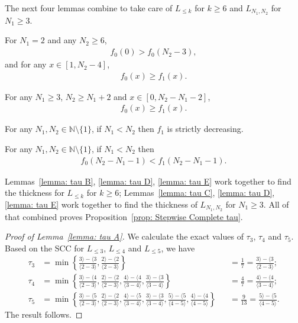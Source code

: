 \documentclass{ws-ijnt}
\begin{document}
	The next four lemmas combine to take care of $L_{\leq k}$ for $k\geq 6$ and $L_{N_1,N_2}$ for $N_1\geq 3$.
	\begin{lemma}\label{lemma: tau B}
		For $N_1=2$ and any $N_2\geq 6$, 
		\begin{align*}
			f_0(0)>f_0(N_2-3),
		\end{align*}
		and for any $x\in[1,N_2-4]$,
		\begin{align*}
			f_0(x)\geq f_1(x).
		\end{align*}
	\end{lemma}
	\begin{lemma}\label{lemma: tau C}
		For any $N_1\geq3$, $N_2\geq N_1+2$ and $x\in[0,N_2-N_1-2]$,
		\begin{align*}
			f_0(x)\geq f_1(x).
		\end{align*}
	\end{lemma}
	\begin{lemma}\label{lemma: tau D}
		For any $N_1,N_2\in\mathbb{N}\setminus\{1\}$, if $N_1<N_2$ then $f_1$ is strictly decreasing.
	\end{lemma}
	\begin{lemma}\label{lemma: tau E}
		For any $N_1,N_2\in\mathbb{N}\setminus\{1\}$, if $N_1<N_2$ then
		\begin{align*}
			f_0(N_2-N_1-1)<f_1(N_2-N_1-1).
		\end{align*}
	\end{lemma}
	Lemmas~\ref{lemma: tau B}, \ref{lemma: tau D}, \ref{lemma: tau E} work together to find the thickness for $L_{\leq k}$ for $k\geq 6$; Lemmas~\ref{lemma: tau C}, \ref{lemma: tau D}, \ref{lemma: tau E} work together to find the thickness of $L_{N_1,N_2}$ for $N_1\geq 3$. All of that combined proves Proposition~\ref{prop: Stepwise Complete tau}.
	
	\begin{proof}[Proof of Lemma~\ref{lemma: tau A}]
		We calculate the exact values of $\tau_3$, $\tau_4$ and $\tau_5$. Based on the SCC for $L_{\leq 3}$, $L_{\leq 4}$ and $L_{\leq 5}$, we have
		\begin{align*}
			\tau_3
			&= \min\left\{ \frac{3\rangle-\langle3}{\langle2 -3\rangle},\frac{2\rangle-\langle 2}{\langle2-3\rangle}\right\}
			&&=\frac{1}{7}=\frac{3\rangle-\langle 3}{\langle 2-3\rangle}; \\
			\tau_4
			&= \min\left\{\frac{3\rangle-\langle4}{\langle 2-3\rangle}, \frac{2\rangle-\langle2}{\langle 2-3\rangle},\frac{4\rangle-\langle 4}{\langle 3-4\rangle},\frac{3\rangle-\langle 3}{\langle3-4\rangle}\right\}
			&&=\frac{4}{7}=\frac{4\rangle-\langle 4}{\langle 3-4\rangle}; \\
			\tau_5
			&= \min\left\{\frac{3\rangle-\langle5}{\langle 2-3\rangle},\frac{2\rangle-\langle2}{\langle 2-3\rangle}, \frac{4\rangle-\langle 5}{\langle3-4\rangle},\frac{3\rangle-\langle 3}{\langle3-4\rangle}, \frac{5\rangle-\langle 5}{\langle4-5\rangle},\frac{4\rangle-\langle 4}{\langle4-5\rangle} \right\} 
			&&=\frac{9}{13}=\frac{5\rangle-\langle5}{\langle 4- 5\rangle}.
		\end{align*}
		The result follows.
	\end{proof}
	
\end{document}

